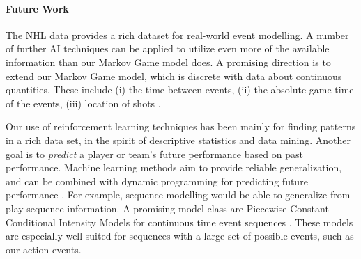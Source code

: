 \documentclass[]{article}
\begin{document}
\paragraph{Future Work} The NHL data provides a rich dataset for real-world event modelling. A number of further AI techniques can be applied to utilize even more of the available information than our Markov Game model does. A promising direction is to extend our Markov Game model, which is discrete with data about continuous quantities. These include (i) the time between events, %
(ii) the absolute game time of the events, %
(iii) location of shots \citep{Krzywicki2005}.

Our use of reinforcement learning techniques has been mainly for finding patterns in a rich data set, in the spirit of descriptive statistics and data mining. Another goal is to {\em predict} a player or team's future performance based on past performance. %
Machine learning methods aim to provide reliable generalization, and can be combined with dynamic programming for predicting future performance \cite{bib:sutton}. For example, sequence modelling would be able to generalize from play sequence information. A promising model class are Piecewise Constant Conditional Intensity Models for continuous time event sequences \citep{Gunawardana2011,Parikh2012}. These models are especially well suited for sequences with a large set of possible events, such as our action events.

%
%

\end{document}
